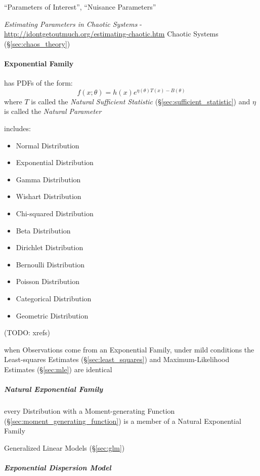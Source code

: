 ``Parameters of Interest'', ``Nuisance Parameters''

\emph{Estimating Parameters in Chaotic Systems} -
\url{http://idontgetoutmuch.org/estimating-chaotic.htm} \fist Chaotic Systems
(\S\ref{sec:chaos_theory})



\paragraph{Exponential Family}\label{sec:exponential_family}\hfill

has PDFs of the form:
\[
  f(x; \theta) = h(x) e^{\eta(\theta)T(x) - B(\theta)}
\]
where $T$ is called the \emph{Natural Sufficient Statistic}
(\S\ref{sec:sufficient_statistic}) and $\eta$ is called the \emph{Natural
  Parameter}

includes:
\begin{itemize}
  \item Normal Distribution
  \item Exponential Distribution
  \item Gamma Distribution
  \item Wishart Distribution
  \item Chi-squared Distribution
  \item Beta Distribution
  \item Dirichlet Distribution
  \item Bernoulli Distribution
  \item Poisson Distribution
  \item Categorical Distribution
  \item Geometric Distribution
\end{itemize}
(TODO: xrefs)

when Observations come from an Exponential Family, under mild conditions the
Least-squares Estimates (\S\ref{sec:least_squares}) and Maximum-Likelihood
Estimates (\S\ref{sec:mle}) are identical



\subparagraph{Natural Exponential Family}
\label{sec:natural_exponential_family}\hfill

every Distribution with a Moment-generating Function
(\S\ref{sec:moment_generating_function}) is a member of a Natural
Exponential Family

Generalized Linear Models (\S\ref{sec:glm})



\subparagraph{Exponential Dispersion Model}
\label{sec:exponential_dispersion}\hfill

